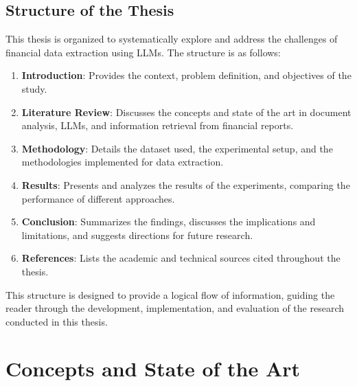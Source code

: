 \documentclass[english, 12pt, a4paper, elec, utf8, a-2b, online]{aaltothesis}
\begin{document}
\subsection{Structure of the Thesis}

This thesis is organized to systematically explore and address the challenges of financial data extraction using \acp{LLM}.
The structure is as follows:
\begin{enumerate}
    \item \textbf{Introduction}: Provides the context, problem definition, and objectives of the study.
    \item \textbf{Literature Review}: Discusses the concepts and state of the art in document analysis, \ac{LLM}s, and information retrieval from financial reports.
    \item \textbf{Methodology}: Details the dataset used, the experimental setup, and the methodologies implemented for data extraction.
    \item \textbf{Results}: Presents and analyzes the results of the experiments, comparing the performance of different approaches.
    \item \textbf{Conclusion}: Summarizes the findings, discusses the implications and limitations, and suggests directions for future research.
    \item \textbf{References}: Lists the academic and technical sources cited throughout the thesis.
\end{enumerate}

This structure is designed to provide a logical flow of information, guiding the reader through the development, implementation, and evaluation of the research conducted in this thesis.

\clearpage
\section{Concepts and State of the Art}
\end{document}
